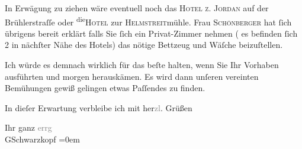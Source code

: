 \pstart
           In Erwägung zu ziehen wäre eventuell noch das \textsc{Hotel z. Jordan} auf der Brühlerstraſſe oder \substVorne{}\textsuperscript{die}\substDazwischen{}\textsc{Hotel}\substHinten{} zur \textsc{Helmstreit}mühle. {\pb}Frau \textsc{Schönberger} hat{ }ſich übrigens bereit erklärt falls Sie{ }ſich ein Privat-Zimmer nehmen ( es befinden{ }ſich 2 in nächſter Nähe des Hotels) das nötige Bettzeug und
               Wäſche beizuſtellen.\pend
           
\pstart
           Ich würde es demnach wirklich für das beſte halten, wenn Sie Ihr Vorhaben ausführten
               und morgen herauskämen. Es wird dann unſeren vereinten Bemühungen gewiß gelingen
               etwas Paſſendes zu finden.\pend
           
\pstart
           In dieſer Erwartung verbleibe ich mit her\textcolor{gray}{zl}. Grüßen\pend
           
\pstart
           Ihr ganz \textcolor{gray}{errg}{\\[\baselineskip]}\spacefill\mbox{GSchwarzkopf}\pend
           \leftskip=0em{}\endnumbering{}
\begin{anhang}
\end{anhang}\newcommand{\dateiname}{L04275}\newcommand{\titel}{Gustav Schwarzkopf an Arthur Schnitzler, 21. 6. 1893}\newcommand{\editorInnen}{Herausgegeben von Jahnke, SelmaMüller, Martin Anton}
